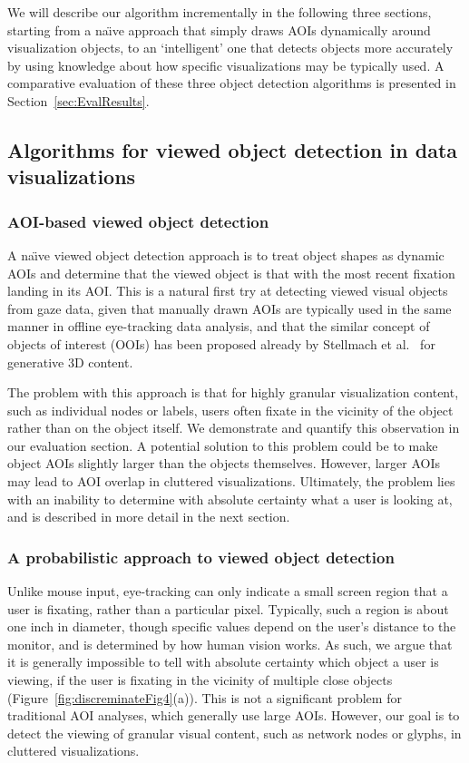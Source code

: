 We will describe our algorithm incrementally in the following three sections, starting from a na\"{\i}ve approach that simply draws AOIs dynamically around visualization objects, to an `intelligent' one that detects objects more accurately by using knowledge about how specific visualizations may be typically used.  A comparative evaluation of these three object detection algorithms is presented in Section~\ref{sec:EvalResults}.

\subsection{Algorithms for viewed object detection in data visualizations}
\label{sec:MethodsAlgorithmsViewedObjectDetection}
\subsubsection{AOI-based viewed object detection}
\label{sec:AOIBasedViewedObjectDetection}
A na\"{\i}ve viewed object detection approach is to treat object shapes as dynamic AOIs and determine that the viewed object is that with the most recent fixation landing in its AOI. This is a natural first try at detecting viewed visual objects from gaze data, given that manually drawn AOIs are typically used in the same manner in offline eye-tracking data analysis, and that the similar concept of objects of interest (OOIs) has been proposed already by Stellmach et al.~\cite{stellmach20103d} for generative 3D content.

The problem with this approach is that for highly granular visualization content, such as individual nodes or labels, users often fixate in the vicinity of the object rather than on the object itself. We demonstrate and quantify this observation in our evaluation section. A potential solution to this problem could be to make object AOIs slightly larger than the objects themselves. However, larger AOIs may lead to AOI overlap in cluttered visualizations. Ultimately, the problem lies with an inability to determine with absolute certainty what a user is looking at, and is described in more detail in the next section.

\subsubsection{A probabilistic approach to viewed object detection}
\label{sec:ProbabilisticObjectDetection}
Unlike mouse input, eye-tracking can only indicate a small screen region that a user is fixating, rather than a particular pixel. Typically, such a region is about one inch in diameter, though specific values depend on the user's distance to the monitor, and is determined by how human vision works. As such, we argue that it is generally impossible to tell with absolute certainty which object a user is viewing, if the user is fixating in the vicinity of multiple close objects (Figure~\ref{fig:discreminateFig4}(a)). This is not a significant problem for traditional AOI analyses, which generally use large AOIs. However, our goal is to detect the viewing of granular visual content, such as network nodes or glyphs, in cluttered visualizations. 

